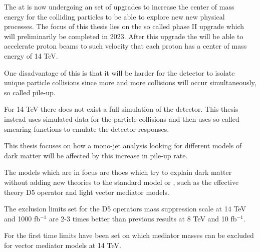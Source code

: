 The \abbrLHC at \abbrCERN is now undergoing an set of upgrades to increase the center of mass energy for the colliding particles to be able to explore new new physical processes. The focus of this thesis lies on the so called phase II upgrade which will preliminarily be completed in 2023. After this upgrade the \abbrLHC will be able to accelerate proton beams to such velocity that each proton has a center of mass energy of 14 TeV.

One disadvantage of this is that it will be harder for the \abbrATLAS detector to isolate unique particle collisions since more and more collisions will occur simultaneously, so called pile-up. 

For 14 TeV there does not exist a full simulation of the \abbrATLAS detector. This thesis instead uses simulated data for the particle collisions and then uses so called smearing functions to emulate the detector responses. 

This thesis focuses on how a mono-jet analysis looking for different \abbrWIMP models of dark matter will be affected by this increase in pile-up rate.

The models which are in focus are thoes which try to explain dark matter without adding new theories to the standard model or \abbrQFT , such as the effective theory D5 operator and light vector mediator models.

The exclusion limits set for the D5 operators mass suppression scale at 14 TeV and 1000 fb$^{-1}$ are 2-3 times better than previous results at 8 TeV and 10 fb$^{-1}$. 

For the first time limits have been set on which mediator masses can be excluded for vector mediator models at 14 TeV.